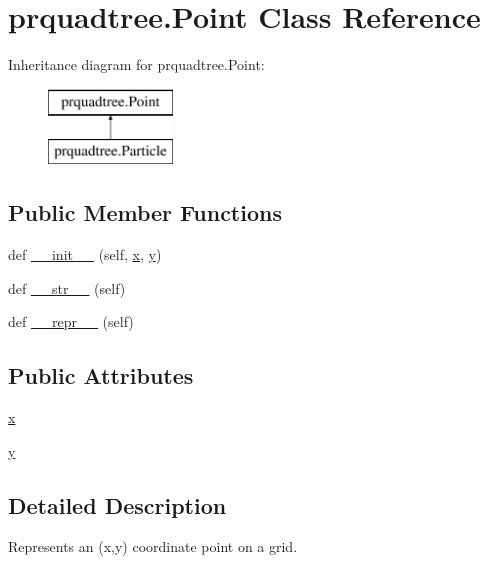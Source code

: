 \section{prquadtree.\+Point Class Reference}
\label{classprquadtree_1_1Point}
Inheritance diagram for prquadtree.\+Point\+:\begin{figure}[H]
\begin{center}
\leavevmode
\includegraphics[height=2.000000cm]{classprquadtree_1_1Point}
\end{center}
\end{figure}
\subsection*{Public Member Functions}
\begin{DoxyCompactItemize}
\item 
def \hyperlink{classprquadtree_1_1Point_a1179022b24fec8ea7a8e0a7e9e7f664d}{\+\_\+\+\_\+init\+\_\+\+\_\+} (self, \hyperlink{classprquadtree_1_1Point_a769eeb814487b26593281a720cc43813}{x}, \hyperlink{classprquadtree_1_1Point_acc50fd274155e9a89996263a7e9f20db}{y})
\item 
def \hyperlink{classprquadtree_1_1Point_ad33b3a05f6dce4daea0b307a42aa2453}{\+\_\+\+\_\+str\+\_\+\+\_\+} (self)
\item 
def \hyperlink{classprquadtree_1_1Point_a8a9a5215cda0279f6958a0b55b4bc11d}{\+\_\+\+\_\+repr\+\_\+\+\_\+} (self)
\end{DoxyCompactItemize}
\subsection*{Public Attributes}
\begin{DoxyCompactItemize}
\item 
\hyperlink{classprquadtree_1_1Point_a769eeb814487b26593281a720cc43813}{x}
\item 
\hyperlink{classprquadtree_1_1Point_acc50fd274155e9a89996263a7e9f20db}{y}
\end{DoxyCompactItemize}


\subsection{Detailed Description}
\begin{DoxyVerb}Represents an (x,y) coordinate point on a grid.
\end{DoxyVerb}
 

